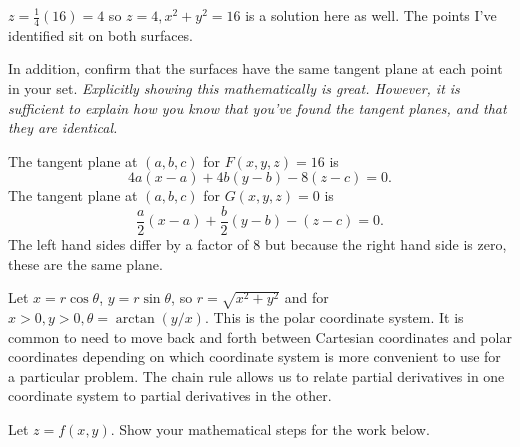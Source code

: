 \documentclass[12pt,letterpaper,noanswers]{exam}
\newcommand{\mb}[1]{\underline{#1}}
\begin{document}
\begin{questions}
\begin{parts}
\begin{solution}
$z = \frac{1}{4}(16) = 4$ so $z=4,x^2+y^2 = 16$ is a solution here as well.  The points I've identified sit on both surfaces.
\end{solution}
\item In addition, confirm that the surfaces have the same tangent plane at each point in your set.  \emph{Explicitly showing this mathematically is great.  However, it is sufficient to explain how you know that you've found the tangent planes, and that they are identical.}
\begin{solution}
The tangent plane at $(a,b,c)$ for $F(x,y,z) = 16$ is \[4a(x-a) + 4b(y-b) -8(z-c) = 0. \]  The tangent plane at $(a,b,c)$ for $G(x,y,z) = 0$ is \[\frac{a}{2}(x-a) + \frac{b}{2}(y-b) -(z-c) = 0.\]  The left hand sides differ by a factor of $8$ but because the right hand side is zero, these are the same plane.
\end{solution}
\end{parts}


\question Let $x = r\cos\theta$, $y=r\sin\theta$, so $r = \sqrt{x^2+y^2}$ and for $x>0, y>0, \theta = \arctan(y/x)$. This is the polar coordinate system.  It is common to need to move back and forth between Cartesian coordinates and polar coordinates depending on which coordinate system is more convenient to use for a particular problem.  The chain rule allows us to relate partial derivatives in one coordinate system to partial derivatives in the other.


Let $z= f(x,y)$.  Show your mathematical steps for the work below.
\end{questions}
\end{document}
